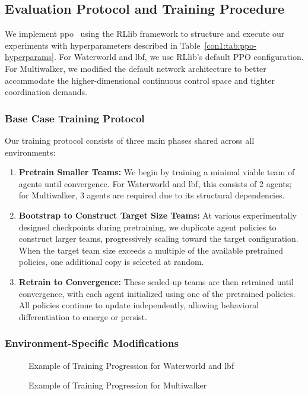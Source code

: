 \subsection{Evaluation Protocol and Training Procedure}

We implement \gls{ppo}~\cite{schulman2017} using the RLlib 
framework to structure and execute our experiments with hyperparameters described in
Table~\cref{con1:tab:ppo-hyperparams}. For Waterworld and \gls{lbf}, 
we use RLlib's default PPO configuration. For Multiwalker, we modified the default 
network architecture to better accommodate the higher-dimensional continuous control space and 
tighter coordination demands.

\subsubsection{Base Case Training Protocol}

Our training protocol consists of three main phases shared across all environments:
\begin{enumerate}
    \item \textbf{Pretrain Smaller Teams:} We begin by training a minimal viable team of 
        agents until convergence. For Waterworld and \gls{lbf}, this consists of 2 agents; 
        for Multiwalker, 3 agents are required due to its structural dependencies.
    \item \textbf{Bootstrap to Construct Target Size Teams:} At various experimentally 
        designed checkpoints during pretraining, we duplicate agent policies to construct 
        larger teams, progressively scaling toward the target configuration. 
        When the target team size exceeds a multiple of the available pretrained policies, 
        one additional copy is selected at random.
    \item \textbf{Retrain to Convergence:} These scaled-up teams are then retrained until 
        convergence, with each agent initialized using one of the pretrained policies. 
        All policies continue to update independently, allowing behavioral differentiation to 
        emerge or persist.
\end{enumerate}

\subsubsection{Environment-Specific Modifications}

\begin{figure}[!ht]
    \centering 
    \caption{Example of Training Progression for Waterworld and \gls{lbf}}
    \label{con1:fig:training_1}
\end{figure}
\begin{figure}[!ht]
    \centering
    \caption{Example of Training Progression for Multiwalker}
    \label{con1:fig:training_2}
\end{figure}

